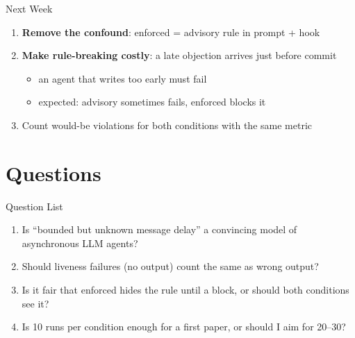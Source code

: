 \documentclass[aspectratio=169,11pt]{beamer}
\begin{document}
\begin{frame}{Next Week}
  \small
  \begin{enumerate}
    \item \textbf{Remove the confound}: enforced = advisory rule in prompt + hook
    \pause
    \item \textbf{Make rule-breaking costly}: a late objection arrives just before commit
    \begin{itemize}
      \item an agent that writes too early must fail
      \item expected: advisory sometimes fails, enforced blocks it
    \end{itemize}
    \pause
    \item Count would-be violations for both conditions with the same metric
  \end{enumerate}
\end{frame}

\section{Questions}
\begin{frame}{Question List}
  \small
  \begin{enumerate}
    \item Is ``bounded but unknown message delay'' a convincing model of asynchronous LLM agents?
    \pause
    \item Should liveness failures (no output) count the same as wrong output?
    \pause
    \item Is it fair that enforced hides the rule until a block, or should both conditions see it?
    \pause
    \item Is 10 runs per condition enough for a first paper, or should I aim for 20--30?
  \end{enumerate}
\end{frame}
\end{document}
